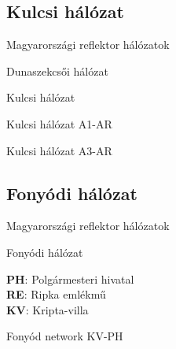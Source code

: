 \documentclass[aspectratio=169]{beamer}
\begin{document}
\subsection{Kulcsi hálózat}

\begin{frame}{Magyarországi reflektor hálózatok}
    \begin{minipage}[c]{0.365\textwidth}
        \centering
        \dszekcso

        Dunaszekcsői hálózat
    \end{minipage}
    \hspace{10pt}
    \begin{minipage}[c]{0.58\textwidth}
        \centering
        \kulcs

        Kulcsi hálózat
    \end{minipage}
\end{frame}




\begin{frame}{Kulcsi hálózat A1-AR}
\end{frame}


\begin{frame}{Kulcsi hálózat A3-AR}
\end{frame}

\subsection{Fonyódi hálózat}

\begin{frame}{Magyarországi reflektor hálózatok}
    \begin{minipage}[c]{0.6\textwidth}
        \centering
        \fonyod

        Fonyódi hálózat
    \end{minipage}
    \hspace{5pt}
    \begin{minipage}[c]{0.3\textwidth}
            \textbf{PH}: Polgármesteri hivatal\\
            \textbf{RE}: Ripka emlékmű\\
            \textbf{KV}: Kripta-villa
    \end{minipage}
\end{frame}



\begin{frame}{Fonyód network KV-PH}
\end{frame}
\end{document}
